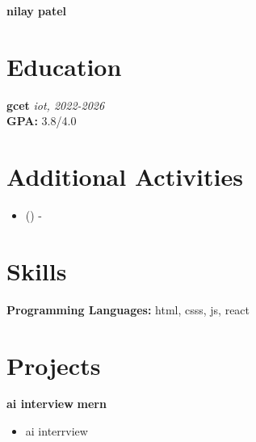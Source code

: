 \documentclass[10pt, letterpaper]{article}
\newenvironment{onecolentry}{}{} %
\newenvironment{highlights}{\begin{itemize}}{\end{itemize}} %
\begin{document}
\begin{center}
    {\LARGE\bfseries nilay patel}\\[5pt]
    {}
\end{center}

\section{Education}
\begin{onecolentry}
    \textbf{gcet} 
    \textit{iot, 2022-2026}\\
    \textbf{GPA:} 3.8/4.0
\end{onecolentry}

\section{Additional Activities}
\begin{onecolentry}
    \begin{highlights}
        \item \textbf{} () - 
    \end{highlights}
\end{onecolentry}

\section{Skills}
\textbf{Programming Languages:} html, csss, js, react\\




\section{Projects}
\begin{onecolentry}
    {\textbf{\large ai interview}} {\hfill \textbf{mern}}
    \begin{itemize}
        \item ai interrview 
    \end{itemize}
\end{onecolentry}
\vspace{7pt}
\end{document}
